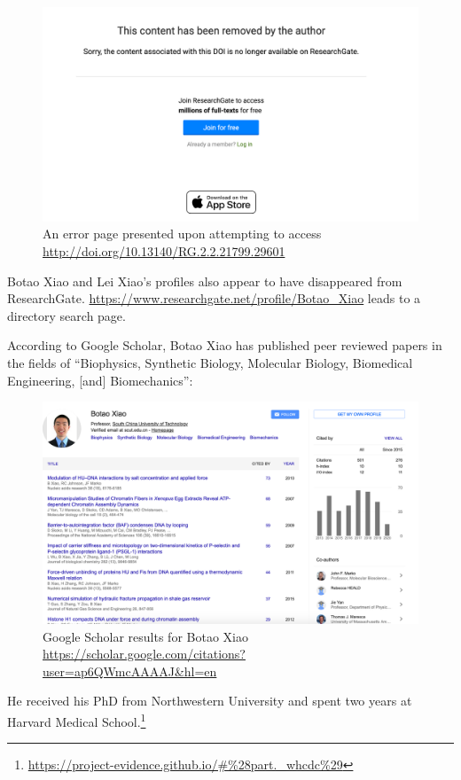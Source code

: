 \documentclass[11pt]{article}
\begin{document}
\begin{figure}[htbp]
\centering
\includegraphics[width=.9\linewidth]{./images/whcdc-research-gate.png}
\caption{An error page presented upon attempting to access \url{http://doi.org/10.13140/RG.2.2.21799.29601}}
\end{figure}

Botao Xiao and Lei Xiao’s profiles also appear to have disappeared from ResearchGate. \url{https://www.researchgate.net/profile/Botao\_Xiao} leads to a directory search page.

According to Google Scholar, Botao Xiao has published peer reviewed papers in the fields of ``Biophysics, Synthetic Biology, Molecular Biology, Biomedical Engineering, [and] Biomechanics'':

\begin{figure}[htbp]
\centering
\includegraphics[width=.9\linewidth]{./images/botao-xiao.png}
\caption{Google Scholar results for Botao Xiao \url{https://scholar.google.com/citations?user=ap6QWmcAAAAJ\&hl=en}}
\end{figure}

He received his PhD from Northwestern University and spent two years at Harvard Medical School.\footnote{\url{https://project-evidence.github.io/\#\%28part.\_whcdc\%29}}
\end{document}
